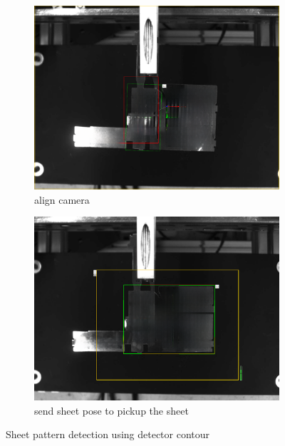 \begin{figure}[h]
    \centering
    \begin{subfigure}[b]{0.48\textwidth}
        \centering
        \includegraphics[width=\textwidth]{figures/sheet-pickup/camera-align.png}
        \caption{align camera}
        \label{subfig:sheet-1}
    \end{subfigure}\hspace{0.1cm}
    \begin{subfigure}[b]{0.48\textwidth}
        \centering
        \includegraphics[width=\textwidth]{figures/sheet-pickup/sheet-pose.png}
        \caption{send sheet pose to pickup the sheet}
        \label{subfig:sheet-0}
    \end{subfigure}
    \caption{Sheet pattern detection using detector contour}
    \label{fig:sheet-scanning}
\end{figure}

